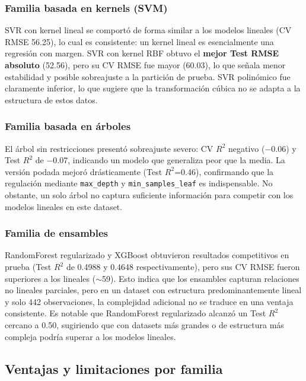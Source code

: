 \subsubsection{Familia basada en kernels (SVM)}
SVR con kernel lineal se comportó de forma similar a los modelos lineales (CV RMSE 56.25), lo cual es consistente: un kernel lineal es esencialmente una regresión con margen. SVR con kernel RBF obtuvo el \textbf{mejor Test RMSE absoluto} (52.56), pero su CV RMSE fue mayor (60.03), lo que señala menor estabilidad y posible sobreajuste a la partición de prueba. SVR polinómico fue claramente inferior, lo que sugiere que la transformación cúbica no se adapta a la estructura de estos datos.

\subsubsection{Familia basada en árboles}
El árbol sin restricciones presentó sobreajuste severo: CV $R^2$ negativo ($-$0.06) y Test $R^2$ de $-$0.07, indicando un modelo que generaliza peor que la media. La versión podada mejoró drásticamente (Test $R^2$=0.46), confirmando que la regulación mediante \texttt{max\_depth} y \texttt{min\_samples\_leaf} es indispensable. No obstante, un solo árbol no captura suficiente información para competir con los modelos lineales en este dataset.

\subsubsection{Familia de ensambles}
RandomForest regularizado y XGBoost obtuvieron resultados competitivos en prueba (Test $R^2$ de 0.4988 y 0.4648 respectivamente), pero sus CV RMSE fueron superiores a los lineales ($\sim$59). Esto indica que los ensambles capturan relaciones no lineales parciales, pero en un dataset con estructura predominantemente lineal y solo 442 observaciones, la complejidad adicional no se traduce en una ventaja consistente. Es notable que RandomForest regularizado alcanzó un Test $R^2$ cercano a 0.50, sugiriendo que con datasets más grandes o de estructura más compleja podría superar a los modelos lineales.

\subsection{Ventajas y limitaciones por familia}

